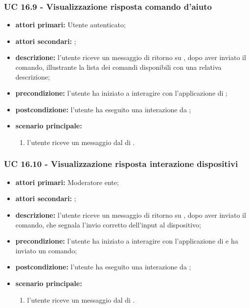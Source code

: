 	\subsubsection{UC 16.9 - Visualizzazione risposta comando d'aiuto }

	\begin{itemize}
			\item \textbf{attori primari:} Utente autenticato;
			\item \textbf{attori secondari:} ;
			\item \textbf{descrizione:} l'utente riceve un messaggio di ritorno su , dopo aver inviato il comando, illustrante la lista dei comandi disponibili con una relativa descrizione;
			\item \textbf{precondizione:} l'utente ha iniziato a interagire con l'applicazione di ;
			\item \textbf{postcondizione:} l'utente ha eseguito una interazione da ;
			\item \textbf{scenario principale:}
			\begin{enumerate}
				\item l'utente riceve un messaggio dal  di .
			\end{enumerate}
		\end{itemize}	


	\subsubsection{UC 16.10 - Visualizzazione risposta interazione dispositivi}
		
		\begin{itemize}
			\item \textbf{attori primari:} Moderatore ente;
			\item \textbf{attori secondari:} ;
			\item \textbf{descrizione:} l'utente riceve un messaggio di ritorno su , dopo aver inviato il comando, che segnala l'invio corretto dell'input al dispositivo;
			\item \textbf{precondizione:} l'utente ha iniziato a interagire con l'applicazione di  e ha inviato un comando;
			\item \textbf{postcondizione:} l'utente ha eseguito una interazione da ;
			\item \textbf{scenario principale:}
			\begin{enumerate}
				\item l'utente riceve un messaggio dal  di .
			\end{enumerate}
		\end{itemize}	
